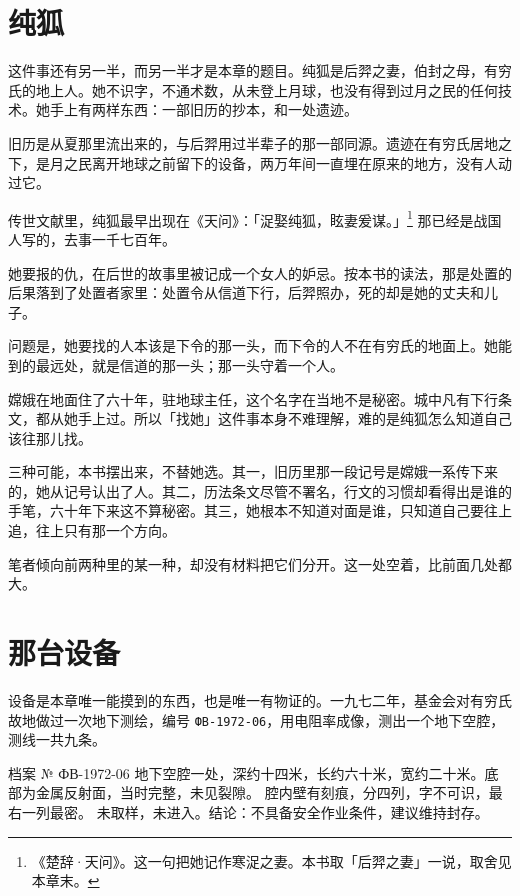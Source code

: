 \section{纯狐}

这件事还有另一半，而另一半才是本章的题目。纯狐是后羿之妻，伯封之母，有穷氏的地上人。她不识字，不通术数，从未登上月球，也没有得到过月之民的任何技术。她手上有两样东西：一部旧历的抄本，和一处遗迹。

旧历是从夏那里流出来的，与后羿用过半辈子的那一部同源。遗迹在有穷氏居地之下，是月之民离开地球之前留下的设备，两万年间一直埋在原来的地方，没有人动过它。

传世文献里，纯狐最早出现在《天问》：「浞娶纯狐，眩妻爰谋。」\footnote{《楚辞·天问》。这一句把她记作寒浞之妻。本书取「后羿之妻」一说，取舍见本章末。} 那已经是战国人写的，去事一千七百年。

她要报的仇，在后世的故事里被记成一个女人的妒忌。按本书的读法，那是处置的后果落到了处置者家里：处置令从信道下行，后羿照办，死的却是她的丈夫和儿子。

问题是，她要找的人本该是下令的那一头，而下令的人不在有穷氏的地面上。她能到的最远处，就是信道的那一头；那一头守着一个人。

嫦娥在地面住了六十年，驻地球主任，这个名字在当地不是秘密。城中凡有下行条文，都从她手上过。所以「找她」这件事本身不难理解，难的是纯狐怎么知道自己该往那儿找。

三种可能，本书摆出来，不替她选。其一，旧历里那一段记号是嫦娥一系传下来的，她从记号认出了人。其二，历法条文尽管不署名，行文的习惯却看得出是谁的手笔，六十年下来这不算秘密。其三，她根本不知道对面是谁，只知道自己要往上追，往上只有那一个方向。

笔者倾向前两种里的某一种，却没有材料把它们分开。这一处空着，比前面几处都大。

\section{那台设备}

设备是本章唯一能摸到的东西，也是唯一有物证的。一九七二年，基金会对有穷氏故地做过一次地下测绘，编号 \texttt{ФВ-1972-06}，用电阻率成像，测出一个地下空腔，测线一共九条。

\begin{archive}[内部参考]{档案 № ФВ-1972-06}
地下空腔一处，深约十四米，长约六十米，宽约二十米。底部为金属反射面，当时完整，未见裂隙。
腔内壁有刻痕，分四列，字不可识，最右一列最密。
未取样，未进入。结论：不具备安全作业条件，建议维持封存。
\end{archive}


